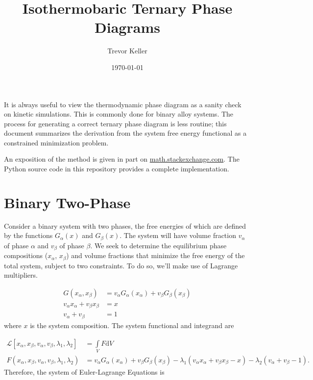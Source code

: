 \documentclass[10pt]{article}
\title{Isothermobaric Ternary Phase Diagrams}
\author{Trevor Keller}
\date{\small \today}
\begin{document}
\maketitle

It is always useful to view the thermodynamic phase diagram as a sanity check on
kinetic simulations. This is commonly done for binary alloy systems. The process
for generating a correct ternary phase diagram is less routine; this document
summarizes the derivation from the system free energy functional as a
constrained minimization problem.

An exposition of the method is given in part on
\href{https://math.stackexchange.com/questions/632/validating-a-mathematical-model-lagrange-formulation-and-geometry}
{math.stackexchange.com}. The Python source code in this repository provides a
complete implementation.

\section*{Binary Two-Phase}

Consider a binary system with two phases, the free energies of which are defined
by the functions $G_{\alpha}(x)$ and $G_{\beta}(x)$. The system will have volume
fraction $v_{\alpha}$ of phase $\alpha$ and $v_{\beta}$ of phase $\beta$. We
seek to determine the equilibrium phase compositions ($x_{\alpha}$, $x_{\beta}$)
and volume fractions that minimize the free energy of the total system, subject
to two constraints. To do so, we'll make use of Lagrange multipliers.

\begin{align}
  G(x_{\alpha}, x_{\beta}) &= v_{\alpha} G_{\alpha}(x_{\alpha})
                            + v_{\beta} G_{\beta}(x_{\beta})\\
  v_{\alpha} x_{\alpha} + v_{\beta} x_{\beta} &= x\\
  v_{\alpha} + v_{\beta} &= 1
\end{align}
where $x$ is the system composition. The system functional and integrand are

\begin{align}
  \mathcal{L}[x_{\alpha}, x_{\beta}, v_{\alpha}, v_{\beta}, \lambda_1, \lambda_2]
  &= \int\limits_VF\mathrm{d}V\\
  F(x_{\alpha}, x_{\beta}, v_{\alpha}, v_{\beta}, \lambda_1, \lambda_2)
  &= v_{\alpha} G_{\alpha}(x_{\alpha}) + v_{\beta} G_{\beta}(x_{\beta})
    - \lambda_1(v_{\alpha} x_{\alpha} + v_{\beta} x_{\beta} - x)
    - \lambda_2(v_{\alpha} + v_{\beta} - 1).
\end{align}
Therefore, the system of Euler-Lagrange Equations is
\end{document}
